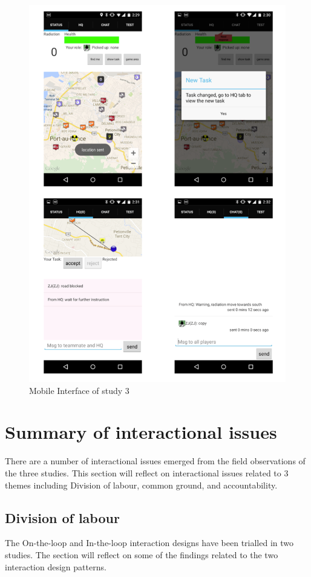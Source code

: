 \begin{figure}[H]
  \centering
  \includegraphics[width=1\textwidth]{img/conclusion/study3interfaceMobile}
  \caption{Mobile Interface of study 3}
  \label{fig:study3interfacemobile}
\end{figure}
\section{Summary of interactional issues}\label{sec:conclusionIssue}
There are a number of interactional issues emerged from the field observations of the three studies. This section will reflect on interactional issues related to 3 themes including Division of labour, common ground, and accountability.

\subsection{Division of labour}\label{sec:conclusionHH}
The On-the-loop and In-the-loop interaction designs have been trialled in two studies. The section will reflect on some of the findings related to the two interaction design patterns. \\

